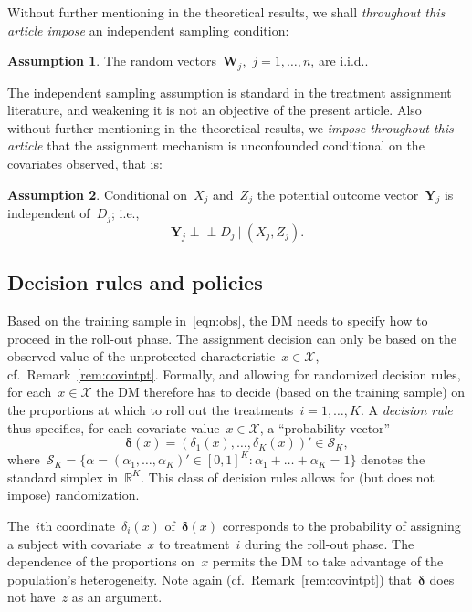 \documentclass[11pt, a4paper]{article}
\newcommand{\R}{\mathbb{R}}
\theoremstyle{definition}
\newtheorem{assumption}{Assumption}[section]
\begin{document}
Without further mentioning in the theoretical results, we shall \emph{throughout this article impose} an independent sampling condition:
\begin{assumption}\label{as:iid}
The random vectors~$\bm W_j$,~$j = 1, \hdots, n$, are i.i.d..
\end{assumption}
%
The independent sampling assumption is standard in the treatment assignment literature, and weakening it is not an objective of the present article. Also without further mentioning in the theoretical results, we \emph{impose throughout this article} that the assignment mechanism is unconfounded conditional on the covariates observed, that is:
%
\begin{assumption}\label{as:cia}
Conditional on~$X_j$ and~$Z_j$ the potential outcome vector~$\bm Y_j$ is independent of~$D_j$; i.e.,~$$\bm Y_j  \perp\!\!\!\perp D_j ~|~ (X_j, Z_j).$$
\end{assumption}

\subsection{Decision rules and policies}\label{sec:recfun}

Based on the training sample in~\eqref{eqn:obs}, the DM needs to specify how to proceed in the roll-out phase. The assignment decision can only be based on the observed value of the unprotected characteristic~$x \in \mathcal{X}$, cf.~Remark~\ref{rem:covintpt}. Formally, and allowing for randomized decision rules, for each~$x \in \mathcal{X}$ the DM therefore has to decide (based on the training sample) on the proportions at which to roll out the treatments~$i = 1, \hdots, K$. A \emph{decision rule} thus specifies, for each covariate value~$x \in \mathcal{X}$, a ``probability vector''
\begin{equation}
\bm{\delta}(x) = \left(\delta_1(x), \hdots, \delta_K(x)\right)' \in \mathscr{S}_K,
\end{equation} where~$\mathscr{S}_K = \{\alpha = (\alpha_1, \hdots, \alpha_K)' \in [0, 1]^K: \alpha_1 + \hdots + \alpha_K = 1\}$ denotes the standard simplex in~$\R^K$. This class of decision rules allows for (but does not impose) randomization.

The~$i$th coordinate~$\delta_i(x)$ of~$\bm{\delta}(x)$ corresponds to the probability of assigning a subject with covariate~$x$ to treatment~$i$ during the roll-out phase. The dependence of the proportions on~$x$ permits the DM to take advantage of the population's heterogeneity. Note again (cf.~Remark~\ref{rem:covintpt}) that~$\bm{\delta}$ does not have~$z$ as an argument.
\end{document}
